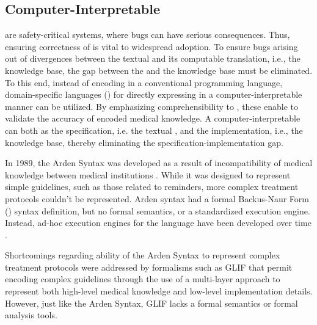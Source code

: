 \subsection{Computer-Interpretable \BPGs{}}\label{sec:computer-interpetable-bpg}

\CDSSs{} are safety-critical systems, where bugs can have serious consequences.
Thus, ensuring correctness of \CDSSs{} is vital to widespread adoption.
To ensure bugs arising out of divergences between the textual \BPG{}
and its computable translation, i.e., the knowledge base, the gap between
the \BPG{} and the knowledge base must be eliminated. To this end, instead of
encoding \BPGs{} in a conventional programming language, domain-specific
languages (\DSLs{}) for directly expressing \BPGs{} in a computer-interpretable manner can
be utilized. By emphasizing comprehensibility to \HCPs{}, these \DSLs{} enable
\HCPs{} to validate the accuracy of encoded medical knowledge.
A computer-interpretable \BPGs{} can both as the specification, i.e. the textual \BPG{},
and the implementation, i.e., the knowledge base, thereby eliminating the
specification-implementation gap.

In 1989, the Arden Syntax was developed as a result of incompatibility
of medical knowledge between medical institutions \cite{HripcsakCBM94}.
While it was designed to represent simple guidelines,
such as those related to reminders, more complex treatment protocols couldn't
be represented. Arden syntax had a formal Backus-Naur Form (\BNF{})
syntax definition, but no formal semantics, or a standardized execution engine.
Instead, ad-hoc execution engines for the language have been developed over
time \cite{ClerqAIM03}.

Shortcomings regarding ability of the Arden Syntax to represent complex
treatment protocols were addressed by formalisms such as GLIF \cite{PelegAMIA00}
that permit encoding complex guidelines through the use of a multi-layer
approach to represent both high-level medical knowledge and low-level
implementation details. However, just like the Arden Syntax, GLIF lacks
a formal semantics or formal analysis tools.

